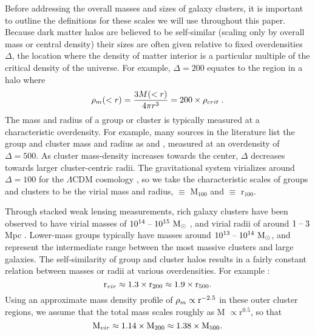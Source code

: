 Before addressing the overall masses and sizes of galaxy clusters, it
is important to outline the definitions for these scales we will use
throughout this paper. Because dark matter halos are believed to be
self-similar (scaling only by overall mass or central density) their
sizes are often given relative to fixed overdensities $\Delta$, the
location where the density of matter interior is a particular multiple
of the critical density of the universe. For example, $\Delta = 200$
equates to the region in a halo where
\begin{equation}
\rho_m(<r) = \frac{3M(<r)}{4\pi{}r^3} = 200\times\rho_{crit}\;. 
\end{equation}
The mass and radius of a group or cluster is typically measured at a
characteristic overdensity. For example, many sources in the
literature list the group and cluster mass and radius as \Mfive{} and
\rfive{}, measured at an overdensity of $\Delta = 500$. As cluster
mass-density increases towards the center, $\Delta$ decreases towards
larger cluster-centric radii. The gravitational system virializes
around $\Delta = 100$ for the $\Lambda{}$CDM cosmology \citep{Eke1996},
so we take the characteristic scales of groups and clusters to be the
virial mass and radius, \Mvir{} $ \equiv $ M$_{100}$ and
\rvir{} $ \equiv $ r$_{100}$.

Through stacked weak lensing measurements, rich galaxy clusters have
been observed to have virial masses of $10^{14}\;\textrm{--}\;10^{15}~\textrm{M}_\odot{}$
\citep{Mandelbaum2008}, and virial radii of around $1\;\textrm{--}\;3$ Mpc
\citep{Vikhlinin2006}. Lower-mass groups typically have masses
around $10^{13} \;\textrm{--}\; 10^{14}~\textrm{M}_\odot{}$, and represent the intermediate
range between the most massive clusters and large galaxies. The
self-similarity of group and cluster halos results in a fairly
constant relation between masses or radii at various overdensities. For
example \citep{Rasheed2011}:
\begin{equation}
\textrm{r\ensuremath{_{vir}}}{} \approx 1.3\times{}\textrm{r\ensuremath{_{200}}}{} \approx
1.9\times{}\textrm{r\ensuremath{_{500}}}{}.
\end{equation}
Using an approximate mass density profile of $\rho_m \propto
\textrm{r}^{-2.5}$ in these outer cluster regions, we assume that the
total mass scales roughly as M $\propto \textrm{r}^{0.5}$, so that
\begin{equation}
\textrm{M\ensuremath{_{vir}}}{} \approx 1.14\times{}\textrm{M\ensuremath{_{200}}}{} \approx 1.38 \times{}\textrm{M\ensuremath{_{500}}}{}.
\end{equation}

